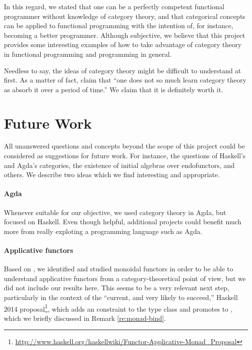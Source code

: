 In this regard, we stated that one can be a perfectly competent
functional programmer without knowledge of category theory, and that
categorical concepts can be applied to functional programming with the
intention of, for instance, becoming a better programmer. Although
subjective, we believe that this project provides some interesting
examples of how to take advantage of category theory in functional
programming and programming in general.

Needless to say, the ideas of category theory might be difficult to
understand at first. As a matter of fact,
\textcite[25]{bird-demoor-1997} claim that ``one does not so much
learn category theory as absorb it over a period of time.'' We claim
that it is definitely worth it.

\section{Future Work}

All unanswered questions and concepts beyond the scope of this project
could be considered as suggestions for future work. For instance, the
questions of Haskell's and Agda's categories, the existence of initial
algebras over endofunctors, and others. We describe two ideas which we
find interesting and appropriate.

\paragraph{Agda}

Whenever suitable for our objective, we used category theory in Agda,
but focused on Haskell. Even though helpful, additional projects could
benefit much more from really exploting a programming language such as
Agda.

\paragraph{Applicative functors}

Based on \parencite{mcbride-paterson-2008}, we identified and studied
monoidal functors in order to be able to understand applicative
functors from a category-theoretical point of view, but we did not
include our results here. This seems to be a very relevant next step,
particularly in the context of the ``current, and very likely to
succeed,'' Haskell 2014 
proposal\footnote{\url{http://www.haskell.org/haskellwiki/Functor-Applicative-Monad_Proposal}},
which adds an  constraint to the
 type class and promotes  to
, which we briefly discussed in Remark
\ref{re:monad-bind}.

\clearemptydoublepage
